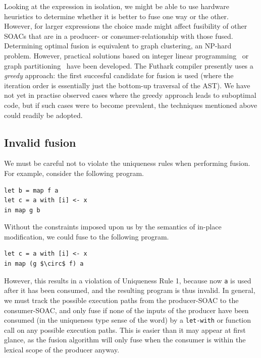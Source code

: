 Looking at the expression in isolation, we might be able to use
hardware heuristics to determine whether it is better to fuse one way
or the other.  However, for larger expressions the choice made might
affect fusibility of other SOACs that are in a producer- or
consumer-relationship with those fused.  Determining optimal fusion is
equivalent to graph clustering, an NP-hard problem.  However,
practical solutions based on integer linear
programming~\cite{Megiddo:1997:OWL:258492.258520} or graph
partitioning~\cite{Kristensen:2016:FPA:2967938.2967945} have been
developed.  The Futhark compiler presently uses a \textit{greedy}
approach: the first succesful candidate for fusion is used (where the
iteration order is essentially just the bottom-up traversal of the
AST).  We have not yet in practise observed cases where the greedy
approach leads to suboptimal code, but if such cases were to become
prevalent, the techniques mentioned above could readily be adopted.

\subsection{Invalid fusion}
\label{sec:invalidfusion}

We must be careful not to violate the uniqueness rules when performing
fusion.  For example, consider the following program.
\begin{lstlisting}
let b = map f a
let c = a with [i] <- x
in map g b
\end{lstlisting}
Without the constraints imposed upon us by the semantics of in-place
modification, we could fuse to the following program.
\begin{lstlisting}[mathescape]
let c = a with [i] <- x
in map (g $\circ$ f) a
\end{lstlisting}
However, this results in a violation of Uniqueness Rule 1, because now
\texttt{a} is used after it has been consumed, and the resulting
program is thus invalid.  In general, we must track the possible
execution paths from the producer-SOAC to the consumer-SOAC, and only
fuse if none of the inputs of the producer have been consumed (in the
uniqueness type sense of the word) by a \lstinline{let-with} or
function call on any possible execution paths.  This is easier than it
may appear at first glance, as the fusion algorithm will only fuse
when the consumer is within the lexical scope of the producer anyway.

